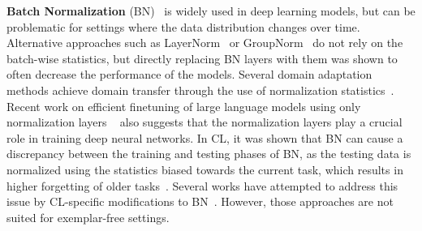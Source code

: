 \documentclass[10pt,twocolumn,letterpaper]{article}
\newcommand\rev[1]{{#1}}
\begin{document}
\textbf{Batch Normalization} (BN)~\cite{ioffe2015batch} is widely used in deep learning models, but can be problematic for settings where the data distribution changes over time. Alternative approaches such as LayerNorm~\cite{ba2016layer} or GroupNorm~\cite{wu2018group} do not rely on the batch-wise statistics, but directly replacing BN layers with them was shown to often decrease the performance of the models.
Several domain adaptation methods achieve domain transfer through the use of normalization statistics~\cite{TENT,steffen2020shiftadapt}. \rev{Recent work on efficient finetuning of large language models using only normalization layers ~\cite{qi2022parameter} also suggests that the normalization layers play a crucial role in training deep neural networks.} 
In CL, it was shown that BN can cause a discrepancy between the training and testing phases of BN, as the testing data is normalized using the statistics biased towards the current task, which results in higher forgetting of older tasks~\cite{santurkar2019does}. Several works have attempted to address this issue by CL-specific modifications to BN~\cite{pham2022continual,cha2023rebalancing}. However, those approaches are not suited for exemplar-free settings. 


\end{document}
